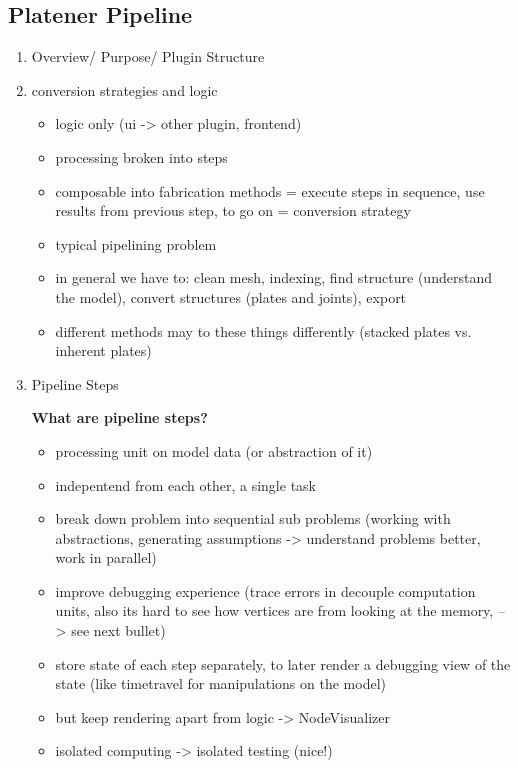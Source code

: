 \documentclass[../ClassicThesis.tex]{subfiles}
\begin{document}
\subsection{Platener Pipeline}

\begin{enumerate}
\item Overview/ Purpose/ Plugin Structure

\item conversion strategies and logic

  \begin{itemize}
  \item logic only (ui -> other plugin, frontend)
  \item processing broken into steps
  \item composable into fabrication methods = execute steps in sequence, use
    results from previous step, to go on = conversion strategy

  \item typical pipelining problem 
  \item in general we have to: clean mesh, indexing, find structure (understand
    the model), convert structures (plates and joints), export
  \item different methods may to these things differently (stacked plates vs.
    inherent plates)

  \end{itemize}

\item Pipeline Steps

  \textbf{What are pipeline steps?}

  \begin{itemize}
  \item processing unit on model data (or abstraction of it)
  \item indepentend from each other, a single task
  \item break down problem into sequential sub problems (working with
    abstractions, generating assumptions -> understand problems better, work in parallel)
  \item improve debugging experience (trace errors in decouple computation
    units, also its hard to see how vertices are from
    looking at the memory, --> see next bullet)
  \item store state of each step separately, to later render a debugging view of
    the state (like timetravel for manipulations on the model)
  \item but keep rendering apart from logic -> NodeVisualizer
  \item isolated computing -> isolated testing (nice!)
  \end{itemize}


\end{enumerate}
\end{document}
